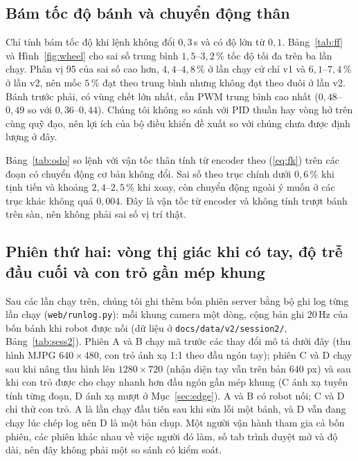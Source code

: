 \documentclass[5p,twocolumn]{elsarticle}
\begin{document}
\subsection{Bám tốc độ bánh và chuyển động thân}\label{sec:wheeltrack}
Chỉ tính bám tốc độ khi lệnh không đổi $0{,}3$\,s và có độ lớn từ $0{,}1$. Bảng~\ref{tab:ff} và Hình~\ref{fig:wheel} cho sai số trung bình $1{,}5$--$3{,}2$\,\% tốc độ tối đa trên ba lần chạy. Phân vị 95 của sai số cao hơn, $4{,}4$--$4{,}8$\,\% ở lần chạy cử chỉ v1 và $6{,}1$--$7{,}4$\,\% ở lần v2, nên mốc $5$\,\% đạt theo trung bình nhưng không đạt theo đuôi ở lần v2. Bánh trước phải, có vùng chết lớn nhất, cần PWM trung bình cao nhất ($0{,}48$--$0{,}49$ so với $0{,}36$--$0{,}44$). Chúng tôi không so sánh với PID thuần hay vòng hở trên cùng quỹ đạo, nên lợi ích của bộ điều khiển đề xuất so với chúng chưa được định lượng ở đây.

Bảng~\ref{tab:odo} so lệnh với vận tốc thân tính từ encoder theo (\ref{eq:fk}) trên các đoạn có chuyển động cơ bản không đổi. Sai số theo trục chính dưới $0{,}6$\,\% khi tịnh tiến và khoảng $2{,}4$--$2{,}5$\,\% khi xoay, còn chuyển động ngoài ý muốn ở các trục khác không quá $0{,}004$. Đây là vận tốc từ encoder và không tính trượt bánh trên sàn, nên không phải sai số vị trí thật.

\subsection{Phiên thứ hai: vòng thị giác khi có tay, độ trễ đầu cuối và con trỏ gần mép khung}\label{sec:sess2}
Sau các lần chạy trên, chúng tôi ghi thêm bốn phiên server bằng bộ ghi log từng lần chạy (\texttt{web/runlog.py}): mỗi khung camera một dòng, cộng bản ghi 20\,Hz của bốn bánh khi robot được nối (dữ liệu ở \texttt{docs/data/v2/session2/}, Bảng~\ref{tab:sess2}). Phiên A và B chạy mã trước các thay đổi mô tả dưới đây (thu hình MJPG $640\times480$, con trỏ ánh xạ 1:1 theo đầu ngón tay); phiên C và D chạy sau khi nâng thu hình lên $1280\times720$ (nhận diện tay vẫn trên bản $640$ px) và sau khi con trỏ được cho chạy nhanh hơn đầu ngón gần mép khung (C ánh xạ tuyến tính từng đoạn, D ánh xạ mượt ở Mục~\ref{sec:edge}). A và B có robot nối; C và D chỉ thử con trỏ. A là lần chạy đầu tiên sau khi sửa lỗi một bánh, và D vẫn đang chạy lúc chép log nên D là một bản chụp. Một người vận hành tham gia cả bốn phiên, các phiên khác nhau về việc người đó làm, số tab trình duyệt mở và độ dài, nên đây không phải một so sánh có kiểm soát.
\end{document}
